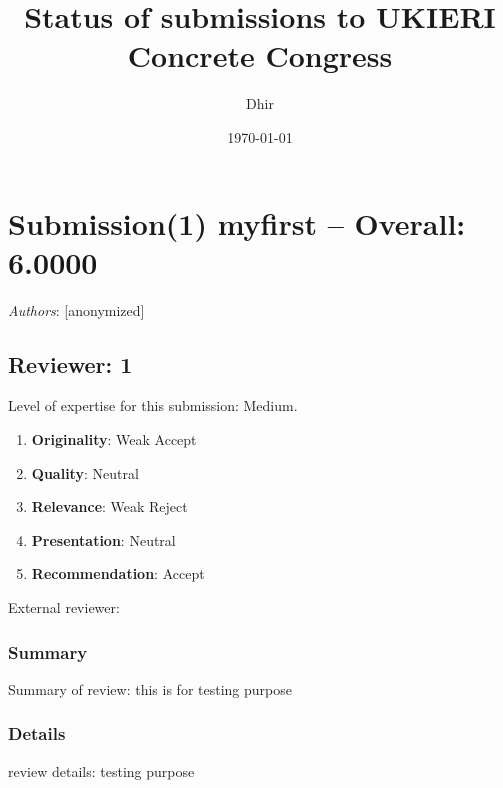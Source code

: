 \documentclass{article}
\begin{document}
\title{ \textbf{Status of submissions to UKIERI Concrete Congress}}
\author{ Dhir }
\date{\today}

\maketitle

\tableofcontents


    
    
    
    
    
    




 

\section{Submission(1) myfirst -- Overall: 6.0000}  

\textit{Authors}: [anonymized]

     
 \subsection{Reviewer:  1 }
    
   Level of expertise for this submission: Medium.   
\begin{enumerate}
    
      \item \textbf{Originality}: Weak Accept
      \item \textbf{Quality}: Neutral 
      \item \textbf{Relevance}: Weak Reject
      \item \textbf{Presentation}: Neutral 
      \item \textbf{Recommendation}: Accept
 \end{enumerate}
External reviewer:      
   \subsubsection*{Summary}
   Summary of review: this is for testing purpose
      
   \subsubsection*{Details}
   review details: testing purpose
\end{document}
